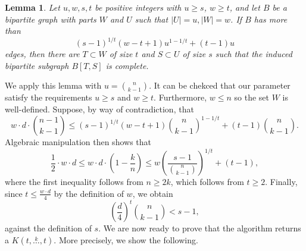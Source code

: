 \documentclass[11pt,a4paper]{article}
\newcommand{\compoverset}[2]{\ensuremath{K(#2, \overset{#1}{\dots}, #2)}}
\newtheorem{lemma}[theorem]{Lemma}
\theoremstyle{definition}
\begin{document}
\begin{lemma}\label{thm:kst}
    Let $u, w, s, t$ be positive integers with $u \geq s$, $w \geq t$, and let $B$ be a bipartite graph with parts $W$ and $U$ such that
    $|U| = u, |W| = w$.
    If $B$ has more than \[(s - 1)^{1 / t}(w - t + 1)u^{1 - 1 / t} + (t - 1)u\] edges, then there are
    $T \subset W$ of size $t$ and $S \subset U$ of size $s$ such that the induced bipartite subgraph $B[T, S]$ is complete.
\end{lemma}

We apply this lemma with $u = \binom{n}{k-1}$.
It can be chekced that our parameter satisfy the requirements $u \geq s$ and $w \geq t$. %
Furthermore, $w \leq n$ so the set $W$ is well-defined. %
Suppose, by way of contradiction, that
\[
    w \cdot d \cdot \binom{n - 1}{k-1} \leq (s - 1)^{1 / t}(w - t + 1)\binom{n}{k-1}^{1 - 1 / t} + (t - 1)\binom{n}{k-1}.
\]
Algebraic manipulation then shows that
\[
    \frac{1}{2} \cdot w \cdot d
    \leq w \cdot d \cdot \left( 1 - \frac{k}{n} \right)
    \leq w \left( \frac{s-1}{\binom{n}{k-1} } \right)^{1 / t} + (t - 1),
\]
where the first inequality follows from $n \geq 2k$, which follows from $t \geq 2$. %
Finally, since $t \leq \frac{w \cdot d}{4}$ by the definition of $w$, we obtain
\[
    \left( \frac{d}{4}\right)^t \binom{n}{k-1} < s-1,
\]
against the definition of $s$.
We are now ready to prove that the algorithm returns a $\compoverset{k}{t}$.
More precisely, we show the following.
\end{document}
